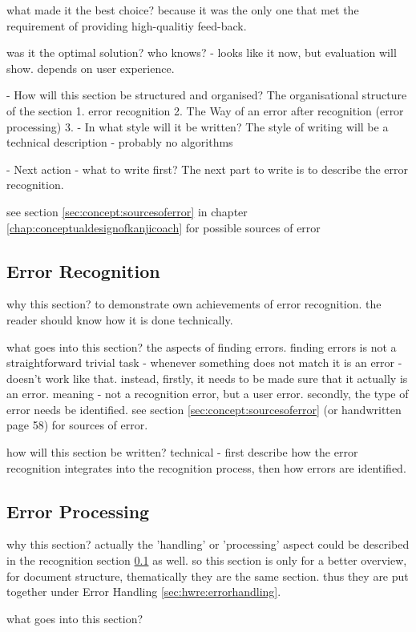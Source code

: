     what made it the best choice? 
    because it was the only one that met the requirement of providing 
    high-qualitiy feed-back.
    
    was it the optimal solution?
    who knows? - looks like it now, but evaluation will show.
    depends on user experience. 

- How will this section be structured and organised?
  The organisational structure of the section 
   1. error recognition
   2. The Way of an error after recognition (error processing)
   3. 
- In what style will it be written?
  The style of writing will be a technical description - probably no algorithms

- Next action - what to write first?
  The next part to write is to describe the error recognition.

see section \ref{sec:concept:sourcesoferror} in chapter 
\ref{chap:conceptualdesignofkanjicoach} for possible sources of error

\subsection{Error Recognition}
\label{sec:hwre:errorrecognition}

why this section? to demonstrate own achievements of error recognition.
the reader should know how it is done technically.

what goes into this section? the aspects of finding errors. finding errors
is not a straightforward trivial task - whenever something does not match
it is an error - doesn't work like that. instead, 
firstly, it needs to be made sure that it actually is an error.
meaning - not a recognition error, but a user error.
secondly, the type of error needs be identified.
see section \ref{sec:concept:sourcesoferror} (or handwritten page 58)
for sources of error.

how will this section be written?
technical - first describe how the error recognition integrates into the
recognition process, then how errors are identified.


\subsection{Error Processing}
\label{sec:hwre:errorprocessing}


why this section? 
actually the 'handling' or 'processing' aspect could be 
described in the recognition section \ref{sec:hwre:errorrecognition} as well.
so this section is only for a better overview, for document structure, 
thematically they are the same section. thus they are put together under
Error Handling \ref{sec:hwre:errorhandling}.

what goes into this section?

